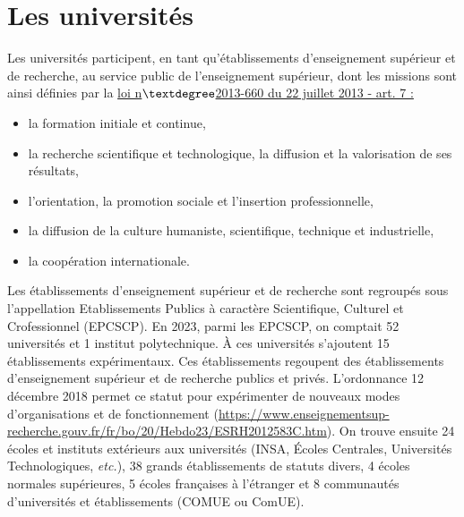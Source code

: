 \chapter{Les universit\'es}
\label{universite}
Les universit\'es participent, en tant qu'\'etablissements d'enseignement sup\'erieur et de recherche,
au service public de l'enseignement sup\'erieur, dont les missions sont ainsi d\'efinies par la 
 \href{https://www.legifrance.gouv.fr/affichCodeArticle.do?cidTexte=LEGITEXT000006071191&idArticle=LEGIARTI000027747739&dateTexte=20170113}{loi n$ \textdegree$2013-660 du 22 juillet 2013 - art. 7 :}
\begin{itemize}
 \item la formation initiale et continue,
 \item la recherche scientifique et technologique, la diffusion et la valorisation de ses r\'esultats,
 \item l'orientation, la promotion sociale et l'insertion professionnelle,
 \item la diffusion de la culture humaniste, scientifique, technique et industrielle,
 \item  la coop\'eration internationale.
\end{itemize}

Les \'etablissements d'enseignement sup\'erieur et de recherche sont regroup\'es sous l'appellation Etablissements Publics \`a
caract\`ere Scientifique, Culturel et Crofessionnel (EPCSCP). En 2023, parmi les EPCSCP, on comptait 52 universit\'es et 1 institut polytechnique. \`A ces universit\'es s'ajoutent 15 \'etablissements exp\'erimentaux. Ces \'etablissements
regoupent des \'etablissements d'enseignement sup\'erieur et de recherche publics et priv\'es. L'ordonnance 12 d\'ecembre 2018 permet ce statut pour exp\'erimenter de nouveaux modes d'organisations et de fonctionnement (\url{https://www.enseignementsup-recherche.gouv.fr/fr/bo/20/Hebdo23/ESRH2012583C.htm}). On trouve ensuite 24 \'ecoles et instituts ext\'erieurs aux universit\'es (INSA, \'Ecoles Centrales, Universit\'es Technologiques, {\em etc.}), 38 grands \'etablissements de statuts divers, 4 \'ecoles normales sup\'erieures,  5 \'ecoles fran\c caises \`a l'\'etranger et 8 communaut\'es d'universit\'es et \'etablissements  (COMUE ou ComUE).

